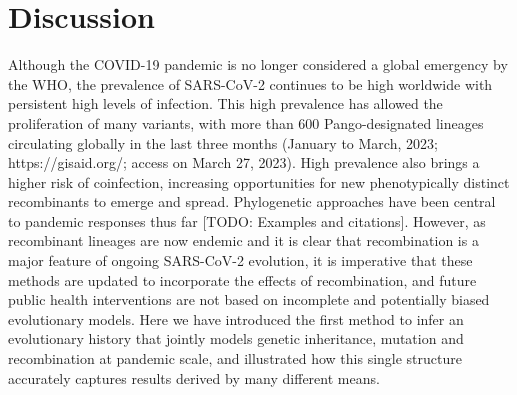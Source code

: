 \documentclass{article}
\begin{document}
\section{Discussion}
Although the COVID-19 pandemic is no longer considered a global emergency
by the WHO, the prevalence of SARS-CoV-2 continues to be high worldwide
with persistent high levels of infection. This high prevalence has allowed the
proliferation of many variants, with more than 600 Pango-designated lineages
circulating globally in the last three months (January to March, 2023;
https://gisaid.org/; access on March 27, 2023). High prevalence also brings a
higher risk of coinfection, increasing opportunities for new phenotypically
distinct recombinants to emerge and spread. Phylogenetic approaches have
been central to pandemic responses thus far [TODO: Examples and citations].
However, as recombinant lineages are now endemic and it is clear that
recombination is a major feature of ongoing SARS-CoV-2 evolution,
it is imperative that these methods are updated to incorporate the
effects of recombination, and future public health interventions are
not based on incomplete and potentially biased evolutionary models.
Here we have introduced the first method to infer an evolutionary
history that jointly models genetic inheritance, mutation and
recombination at pandemic scale, and illustrated how this single
structure accurately captures results derived by many different means.
\end{document}
